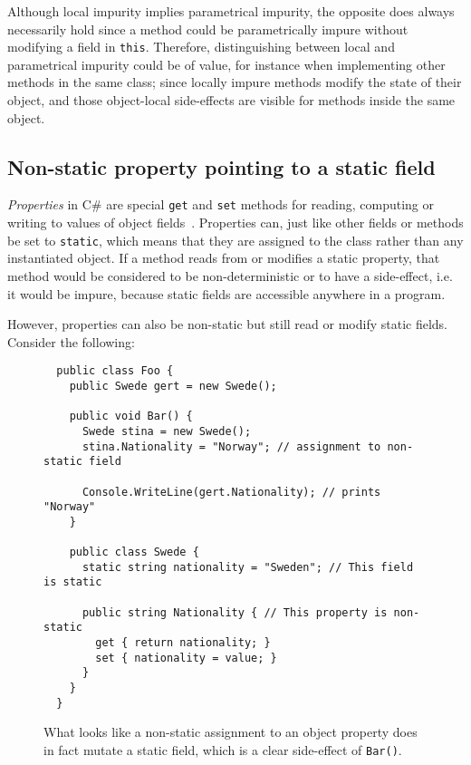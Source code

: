 \documentclass[a4paper,12pt]{article}
\begin{document}
Although local impurity implies parametrical impurity, the opposite does always necessarily hold since a method could be parametrically impure without modifying a field in \texttt{this}. Therefore, distinguishing between local and parametrical impurity could be of value, for instance when implementing other methods in the same class; since locally impure methods modify the state of their object, and those object-local side-effects are visible for methods inside the same object.

\subsection{Non-static property pointing to a static field} \label{sub:non-static-property}
\textit{Properties} in C\# are special \texttt{get} and \texttt{set} methods for reading, computing or writing to values of object fields~\cite{microsoft-properties}. Properties can, just like other fields or methods be set to \texttt{static}, which means that they are assigned to the class rather than any instantiated object. If a method reads from or modifies a static property, that method would be considered to be non-deterministic or to have a side-effect, i.e. it would be impure, because static fields are accessible anywhere in a program.

However, properties can also be non-static but still read or modify static fields. Consider the following:

\begin{figure}[H]
  \centering
  \begin{lstlisting}
  public class Foo {
    public Swede gert = new Swede();

    public void Bar() {
      Swede stina = new Swede();
      stina.Nationality = "Norway"; // assignment to non-static field

      Console.WriteLine(gert.Nationality); // prints "Norway"
    }

    public class Swede {
      static string nationality = "Sweden"; // This field is static

      public string Nationality { // This property is non-static
        get { return nationality; }
        set { nationality = value; }
      }
    }
  }
  \end{lstlisting}
  \caption{What looks like a non-static assignment to an object property does in fact mutate a static field, which is a clear side-effect of \texttt{Bar()}.}
  \label{fig:non-static-property-example}
\end{figure}
\end{document}
